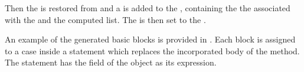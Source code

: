 Then the  is restored from  and a  is added to the
, containing the the  associated with the  and the
computed  list. The  is then set to the .

An example of the generated basic blocks is provided in . Each block is assigned to
a case inside a  statement which replaces the incorporated body of the method. The  statement
has the  field of the  object as its expression.

\begin{figure}[htb]
\end{figure}
